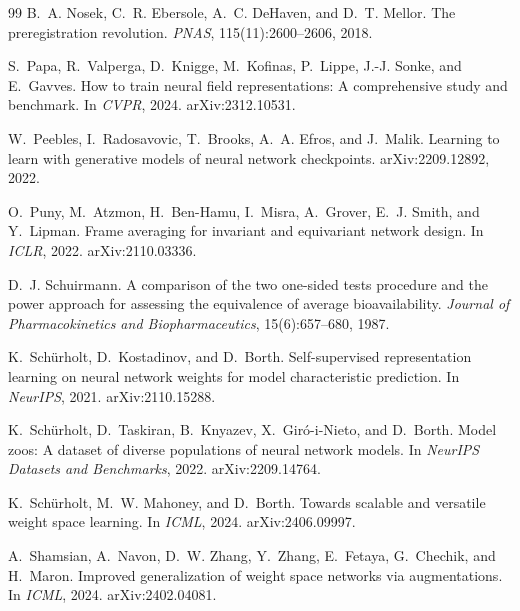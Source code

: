 \documentclass[10pt,twocolumn,letterpaper]{article}
\theoremstyle{definition}
\begin{document}
\begin{thebibliography}{99}
B.~A. Nosek, C.~R. Ebersole, A.~C. DeHaven, and D.~T. Mellor.
\newblock The preregistration revolution.
\newblock \emph{PNAS}, 115(11):2600--2606, 2018.

S.~Papa, R.~Valperga, D.~Knigge, M.~Kofinas, P.~Lippe, J.-J. Sonke, and E.~Gavves.
\newblock How to train neural field representations: A comprehensive study and benchmark.
\newblock In \emph{CVPR}, 2024. arXiv:2312.10531.

W.~Peebles, I.~Radosavovic, T.~Brooks, A.~A. Efros, and J.~Malik.
\newblock Learning to learn with generative models of neural network checkpoints.
\newblock arXiv:2209.12892, 2022.

O.~Puny, M.~Atzmon, H.~Ben-Hamu, I.~Misra, A.~Grover, E.~J. Smith, and Y.~Lipman.
\newblock Frame averaging for invariant and equivariant network design.
\newblock In \emph{ICLR}, 2022. arXiv:2110.03336.

D.~J. Schuirmann.
\newblock A comparison of the two one-sided tests procedure and the power approach for assessing
the equivalence of average bioavailability.
\newblock \emph{Journal of Pharmacokinetics and Biopharmaceutics}, 15(6):657--680, 1987.

K.~Sch\"urholt, D.~Kostadinov, and D.~Borth.
\newblock Self-supervised representation learning on neural network weights for model
characteristic prediction.
\newblock In \emph{NeurIPS}, 2021. arXiv:2110.15288.

K.~Sch\"urholt, D.~Taskiran, B.~Knyazev, X.~Gir\'o-i-Nieto, and D.~Borth.
\newblock Model zoos: A dataset of diverse populations of neural network models.
\newblock In \emph{NeurIPS Datasets and Benchmarks}, 2022. arXiv:2209.14764.

K.~Sch\"urholt, M.~W. Mahoney, and D.~Borth.
\newblock Towards scalable and versatile weight space learning.
\newblock In \emph{ICML}, 2024. arXiv:2406.09997.

A.~Shamsian, A.~Navon, D.~W. Zhang, Y.~Zhang, E.~Fetaya, G.~Chechik, and H.~Maron.
\newblock Improved generalization of weight space networks via augmentations.
\newblock In \emph{ICML}, 2024. arXiv:2402.04081.


\end{thebibliography}
\end{document}

